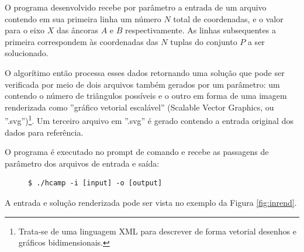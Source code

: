 \documentclass[12pt,a4paper]{article}
\begin{document}
O programa desenvolvido recebe por parâmetro a entrada de um arquivo contendo em sua primeira linha um número $N$ total de coordenadas, e o valor para o eixo $X$ das âncoras $A$ e $B$ respectivamente. As linhas subsequentes a primeira correspondem às coordenadas das $N$ tuplas do conjunto $P$ a ser solucionado.

O algorítimo então processa esses dados retornando uma solução que pode ser verificada por meio de dois arquivos também gerados por um parâmetro: um contendo o número de triângulos possíveis e o outro em forma de uma imagem renderizada como ''gráfico vetorial escalável'' (Scalable Vector Graphics, ou ''.svg'')\footnote{Trata-se de uma linguagem XML para descrever de forma vetorial desenhos e gráficos bidimensionais.}. Um terceiro arquivo em ''.svg'' é gerado contendo a entrada original dos dados para referência.

O programa é executado no prompt de comando e recebe as passagens de parâmetro dos arquivos de entrada e saída:

\begin{figure}[!h]
\centering
\begin{BVerbatim}
$ ./hcamp -i [input] -o [output]
\end{BVerbatim}
\end{figure}

A entrada e solução renderizada pode ser vista no exemplo da Figura \ref{fig:inrend}.
\end{document}
